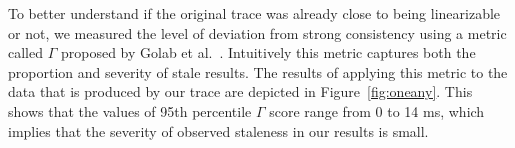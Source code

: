 \documentclass[journal, compsoc]{IEEEtran}
\begin{document}
	To better understand if the original trace was already close to being linearizable or not, we measured the level of deviation from strong consistency using a metric called $\Gamma$ proposed by Golab et al.~\cite{DBLP:conf/cloud/GolabRAKWG13}. Intuitively this
	metric captures both the proportion and severity of stale results. The results of applying this metric to the data that is produced by our trace are depicted in Figure~\ref{fig:oneany}. This shows that the values of 95th percentile 
	$\Gamma$ score range from 0 to 14 ms, which implies that the severity of observed staleness in our results is  small.
	
\end{document}
